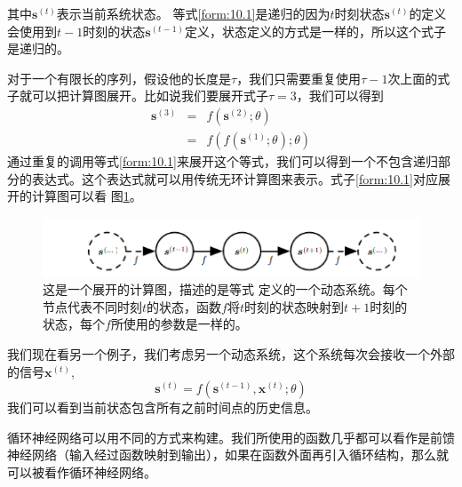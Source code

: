 其中$\bm{s}^{(t)}$表示当前系统状态。
等式\ref{form:10.1}是递归的因为$t$时刻状态$\bm{s}^{(t)}$的定义会使用到$t-1$时刻的状态$\bm{s}^{(t-1)}$定义，状态定义的方式是一样的，所以这个式子是递归的。

对于一个有限长的序列，假设他的长度是$\tau$，我们只需要重复使用$\tau-1$次上面的式子就可以把计算图展开。比如说我们要展开式子$\tau =3$，我们可以得到
\begin{eqnarray}
\bm{s}^{(3)} & = & f(\bm{s}^{(2)};\theta) \\
& = & f(f(\bm{s}^{(1)};\theta);\theta)
\end{eqnarray}
通过重复的调用等式\ref{form:10.1}来展开这个等式，我们可以得到一个不包含递归部分的表达式。这个表达式就可以用传统无环计算图来表示。式子\ref{form:10.1}对应展开的计算图可以看 
图\ref{fig:10_1}。
\begin{figure}[htbp] %
   \centering
   \includegraphics[width=6in]{fig/chap10/10_1.PNG} 
   \caption{这是一个展开的计算图，描述的是等式 定义的一个动态系统。每个节点代表不同时刻$t$的状态，函数$f$将$t$时刻的状态映射到$t+1$时刻的状态，每个$f$所使用的参数是一样的。}
   \label{fig:10_1}
\end{figure}

我们现在看另一个例子，我们考虑另一个动态系统，这个系统每次会接收一个外部的信号$\bm{x}^{(t)}$,
\begin{equation}
\bm{s}^{(t)} = f(\bm{s}^{(t-1)},\bm{x}^{(t)};\theta)
\label{form:10.4}
\end{equation}
我们可以看到当前状态包含所有之前时间点的历史信息。

循环神经网络可以用不同的方式来构建。我们所使用的函数几乎都可以看作是前馈神经网络（输入经过函数映射到输出），如果在函数外面再引入循环结构，那么就可以被看作循环神经网络。

